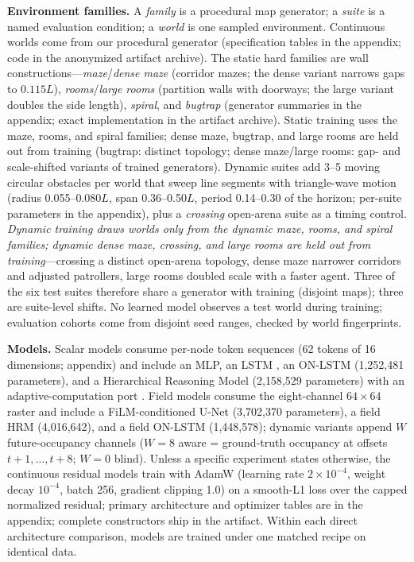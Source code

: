\documentclass[letterpaper]{article} %
\begin{document}
\textbf{Environment families.} A \emph{family} is a procedural map generator; a \emph{suite} is a named evaluation condition; a \emph{world} is one sampled environment. Continuous worlds come from our procedural generator (specification tables in the appendix; code in the anonymized artifact archive). The static hard families are wall constructions---\emph{maze}/\emph{dense maze} (corridor mazes; the dense variant narrows gaps to $0.115L$), \emph{rooms}/\emph{large rooms} (partition walls with doorways; the large variant doubles the side length), \emph{spiral}, and \emph{bugtrap} (generator summaries in the appendix; exact implementation in the artifact archive). Static training uses the maze, rooms, and spiral families; dense maze, bugtrap, and large rooms are held out from training (bugtrap: distinct topology; dense maze/large rooms: gap- and scale-shifted variants of trained generators). Dynamic suites add 3--5 moving circular obstacles per world that sweep line segments with triangle-wave motion (radius 0.055--0.080$L$, span 0.36--0.50$L$, period 0.14--0.30 of the horizon; per-suite parameters in the appendix), plus a \emph{crossing} open-arena suite as a timing control. \emph{Dynamic training draws worlds only from the dynamic maze, rooms, and spiral families; dynamic dense maze, crossing, and large rooms are held out from training}---crossing a distinct open-arena topology, dense maze narrower corridors and adjusted patrollers, large rooms doubled scale with a faster agent. Three of the six test suites therefore share a generator with training (disjoint maps); three are suite-level shifts. No learned model observes a test world during training; evaluation cohorts come from disjoint seed ranges, checked by world fingerprints.

\textbf{Models.} Scalar models consume per-node token sequences (62 tokens of 16 dimensions; appendix) and include an MLP, an LSTM \citep{hochreiter1997lstm}, an ON-LSTM \citep{shen2019onlstm} (1{,}252{,}481 parameters), and a Hierarchical Reasoning Model \citep[HRM;][]{wang2025hrm} (2{,}158{,}529 parameters) with an adaptive-computation port \citep{graves2016act,banino2021pondernet}. Field models consume the eight-channel $64{\times}64$ raster and include a FiLM-conditioned U-Net \citep{ronneberger2015unet,perez2018film} (3{,}702{,}370 parameters), a field HRM (4{,}016{,}642), and a field ON-LSTM (1{,}448{,}578); dynamic variants append $W$ future-occupancy channels ($W{=}8$ aware = ground-truth occupancy at offsets $t{+}1,\ldots,t{+}8$; $W{=}0$ blind). Unless a specific experiment states otherwise, the continuous residual models train with AdamW (learning rate $2{\times}10^{-4}$, weight decay $10^{-4}$, batch 256, gradient clipping 1.0) on a smooth-L1 loss over the capped normalized residual; primary architecture and optimizer tables are in the appendix; complete constructors ship in the artifact. Within each direct architecture comparison, models are trained under one matched recipe on identical data.
\end{document}
